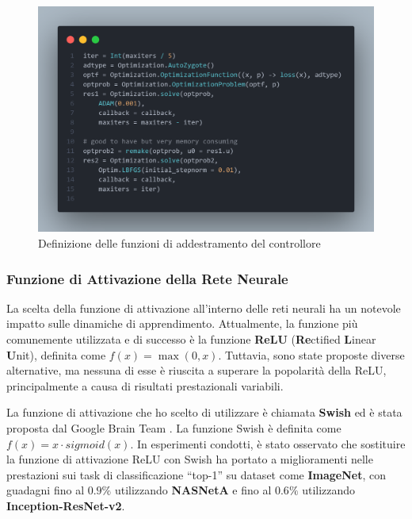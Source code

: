 \begin{figure}[H]
    \begin{center}
		\includegraphics[width=\textwidth]{img/controller3.png}
		\caption{Definizione delle funzioni di addestramento del controllore}
		\label{fig:controller3}
	\end{center}
\end{figure}

\subsubsection*{Funzione di Attivazione della Rete Neurale}
La scelta della funzione di attivazione all'interno delle reti neurali 
ha un notevole impatto sulle dinamiche di apprendimento. Attualmente, 
la funzione più comunemente utilizzata e di successo è la funzione 
\textbf{ReLU} (\textbf{Re}ctified \textbf{L}inear \textbf{U}nit), 
definita come $f(x) = \max(0, x)$. Tuttavia, sono state proposte 
diverse alternative, ma nessuna di esse è riuscita a superare la 
popolarità della ReLU, principalmente a causa di risultati 
prestazionali variabili.

La funzione di attivazione che ho scelto di utilizzare è chiamata 
\textbf{Swish} ed è stata proposta dal Google Brain Team 
\cite{ramachandran2017searching}. La funzione Swish è definita 
come $f(x) = x \cdot sigmoid(x)$. In esperimenti condotti, è 
stato osservato che sostituire la funzione di attivazione ReLU 
con Swish ha portato a miglioramenti nelle prestazioni sui task 
di classificazione ``top-1'' su dataset come \textbf{ImageNet}, con 
guadagni fino al $0.9\%$ utilizzando \textbf{NASNetA} e fino al 
$0.6\%$ utilizzando \textbf{Inception-ResNet-v2}.


